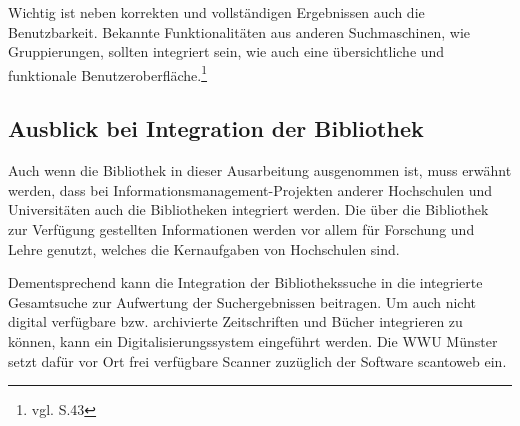 Wichtig ist neben korrekten und vollständigen Ergebnissen auch die Benutzbarkeit. Bekannte Funktionalitäten aus anderen Suchmaschinen, wie Gruppierungen, sollten integriert sein, wie auch eine übersichtliche und funktionale Benutzeroberfläche.\footnote{vgl. \cite{vogl_fortschritte_2012} S.43} 

\subsection{Ausblick bei Integration der Bibliothek}
Auch wenn die Bibliothek in dieser Ausarbeitung ausgenommen ist, muss erwähnt werden, dass bei Informationsmanagement-Projekten anderer Hochschulen und Universitäten auch die Bibliotheken integriert werden. Die über die Bibliothek zur Verfügung gestellten Informationen werden vor allem für Forschung und Lehre genutzt, welches die Kernaufgaben von Hochschulen sind.

Dementsprechend kann die Integration der Bibliothekssuche in die integrierte Gesamtsuche zur Aufwertung der Suchergebnissen beitragen. Um auch nicht digital verfügbare bzw. archivierte Zeitschriften und Bücher integrieren zu können, kann ein Digitalisierungssystem eingeführt werden. Die WWU Münster setzt dafür vor Ort frei verfügbare Scanner zuzüglich der Software scantoweb ein.
